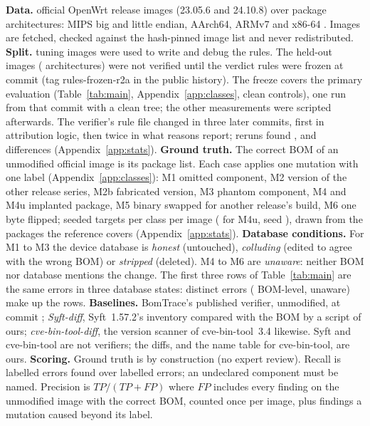 \documentclass[sigconf,nonacm]{acmart}
\newcommand{\ubreak}{\textunderscore\allowbreak}
\newcommand{\vd}[1]{{\ttfamily\let\_\ubreak #1}}
\begin{document}
\textbf{Data.} \nImages{} official OpenWrt release images (23.05.6 and 24.10.8) over \nArchAll{} package architectures: MIPS big and little endian, AArch64, ARMv7 and x86-64 \cite{openwrt}. Images are fetched, checked against the hash-pinned image list and never redistributed.
\textbf{Split.} \nTuneImages{} tuning images were used to write and debug the rules. The \nHeldImages{} held-out images (\nArchHeld{} architectures) were not verified until the verdict rules were frozen at commit \texttt{\freezeCommit} (tag \vd{rules-frozen-r2a} in the public history). The freeze covers the primary evaluation (Table~\ref{tab:main}, Appendix~\ref{app:classes}, clean controls), one run from that commit with a clean tree; the other measurements were scripted afterwards. The verifier's rule file changed in three later commits, first in attribution logic, then twice in what reasons report; reruns found \postDiffs{}, \verdictCheckDiffs{} and \verdictRecheckDiffs{} differences (Appendix~\ref{app:stats}).
\textbf{Ground truth.} The correct BOM of an unmodified official image is its package list. Each case applies one mutation with one label (Appendix~\ref{app:classes}): M1 omitted component, M2 version of the other release series, M2b fabricated version, M3 phantom component, M4 and M4u implanted package, M5 binary swapped for another release's build, M6 one byte flipped; \kPerClass{} seeded targets per class per image (\kUnindexed{} for M4u, seed \seed), drawn from the packages the reference covers (Appendix~\ref{app:stats}).
\textbf{Database conditions.} For M1 to M3 the device database is \emph{honest} (untouched), \emph{colluding} (edited to agree with the wrong BOM) or \emph{stripped} (deleted). M4 to M6 are \emph{unaware}: neither BOM nor database mentions the change. The first three rows of Table~\ref{tab:main} are the same \nBomErrCases{} errors in three database states: \nDistinctErr{} distinct errors (\nBomErrCases{} BOM-level, \nUnawareCases{} unaware) make up the \nHeldCases{} rows.
\textbf{Baselines.} BomTrace's published verifier, unmodified, at commit \texttt{\bomtraceCommit}; \emph{Syft-diff}, Syft~1.57.2's inventory compared with the BOM by a script of ours; \emph{cve-bin-tool-diff}, the version scanner of cve-bin-tool~3.4 likewise. Syft and cve-bin-tool are not verifiers; the diffs, and the name table for cve-bin-tool, are ours.
\textbf{Scoring.} Ground truth is by construction (no expert review). Recall is labelled errors found over labelled errors; an undeclared component must be named. Precision is $TP/(TP+FP)$ where $FP$ includes every finding on the unmodified image with the correct BOM, counted once per image, plus findings a mutation caused beyond its label.
\end{document}
